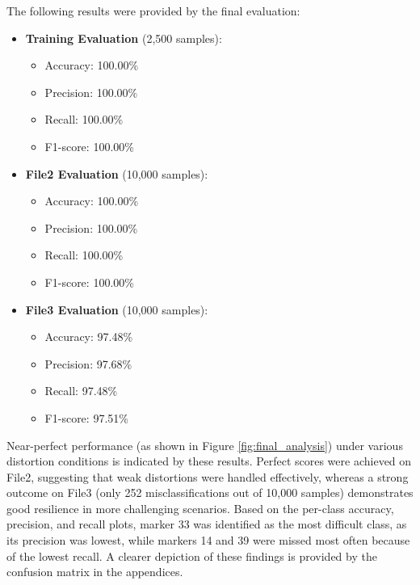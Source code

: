 \documentclass[conference]{IEEEtran}
\begin{document}
The following results were provided by the final evaluation:

\begin{itemize}
    \item \textbf{Training Evaluation} (2,500 samples):
        \begin{itemize}
            \item Accuracy: 100.00\%
            \item Precision: 100.00\%
            \item Recall: 100.00\%
            \item F1-score: 100.00\%
        \end{itemize}
    \item \textbf{File2 Evaluation} (10,000 samples):
        \begin{itemize}
            \item Accuracy: 100.00\%
            \item Precision: 100.00\%
            \item Recall: 100.00\%
            \item F1-score: 100.00\%
        \end{itemize}
    \item \textbf{File3 Evaluation} (10,000 samples):
        \begin{itemize}
            \item Accuracy: 97.48\%
            \item Precision: 97.68\%
            \item Recall: 97.48\%
            \item F1-score: 97.51\%
        \end{itemize}
\end{itemize}

Near-perfect performance (as shown in Figure \ref{fig:final_analysis}) under various distortion conditions is indicated by these results.
Perfect scores were achieved on File2, suggesting that weak distortions were handled effectively, whereas a strong outcome on File3 (only
252 misclassifications out of 10,000 samples) demonstrates good resilience in more challenging scenarios. Based on the per-class accuracy,
precision, and recall plots, marker 33 was identified as the most difficult class, as its precision was lowest, while markers 14 and 39
were missed most often because of the lowest recall. A clearer depiction of these findings is provided by the confusion matrix in the appendices.
\end{document}
